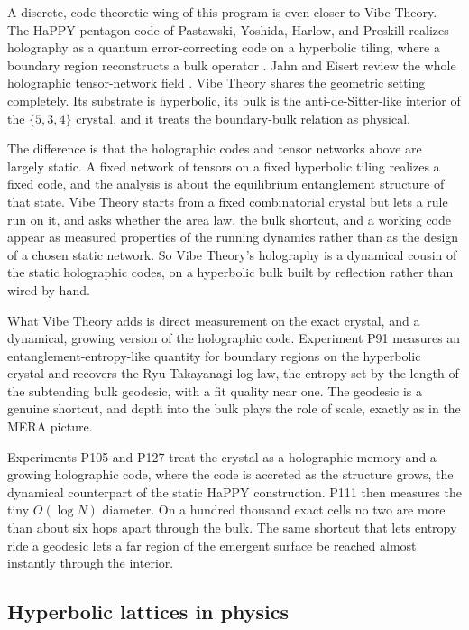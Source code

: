 A discrete, code-theoretic wing of this program is even
closer to Vibe Theory. The HaPPY pentagon code of Pastawski, Yoshida, Harlow, and Preskill realizes
holography as a quantum error-correcting code on a hyperbolic tiling, where a boundary region reconstructs a
bulk operator \cite{pastawski2015}. Jahn and Eisert review the whole holographic tensor-network field
\cite{jahn2021}. Vibe Theory shares the geometric setting completely. Its substrate is hyperbolic, its bulk
is the anti-de-Sitter-like interior of the $\{5,3,4\}$ crystal, and it treats the boundary-bulk relation as
physical.

The difference is that the holographic codes and tensor networks above are largely static. A fixed network of
tensors on a fixed hyperbolic tiling realizes a fixed code, and the analysis is about the equilibrium
entanglement structure of that state. Vibe Theory starts from a fixed combinatorial crystal but lets a rule
run on it, and asks whether the area law, the bulk shortcut, and a working code appear as measured properties
of the running dynamics rather than as the design of a chosen static network. So Vibe Theory's holography is a
dynamical cousin of the static holographic codes, on a hyperbolic bulk built by reflection rather than wired
by hand.

What Vibe Theory adds is direct measurement on the exact crystal, and a dynamical, growing version of the
holographic code. Experiment P91 measures an entanglement-entropy-like quantity for boundary regions on the
hyperbolic crystal and recovers the Ryu-Takayanagi log law, the entropy set by the length of the subtending
bulk geodesic, with a fit quality near one. The geodesic is a genuine shortcut, and depth into the bulk plays
the role of scale, exactly as in the MERA picture.

Experiments P105 and P127 treat the crystal as a
holographic memory and a growing holographic code, where the code is accreted as the structure grows, the
dynamical counterpart of the static HaPPY construction. P111 then measures the tiny $O(\log N)$ diameter. On a
hundred thousand exact cells no two are more than about six hops apart through the bulk. The same shortcut that
lets entropy ride a geodesic lets a far region of the emergent surface be reached almost instantly through the
interior.

\subsection{Hyperbolic lattices in physics}

